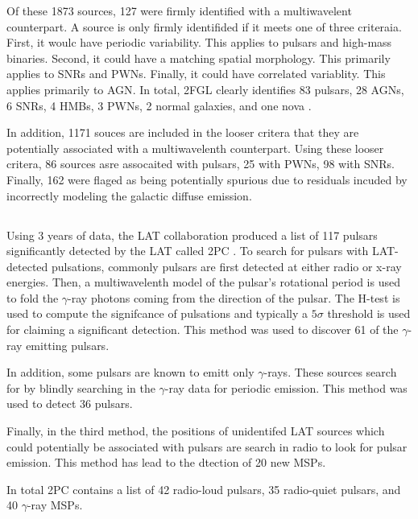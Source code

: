 Of these 1873 sources, 127 were firmly identified with a multiwavelent
counterpart.  A source is only firmly identifided if it meets one of three
criteraia. First, it woulc have periodic variability.  This applies to
pulsars and high-mass binaries.  Second, it could have a matching spatial
morphology. This primarily applies to \acp{SNR} and \acp{PWN}. Finally,
it could have correlated variablity. This applies primarily to \ac{AGN}.
In total, \ac{2FGL} clearly identifies 83 pulsars, 28 \acp{AGN}, 6
\acp{SNR}, 4 \acp{HMB}, 3 \acp{PWN}, 2 normal galaxies, and one nova
\cite{nolan_2012_fermi-large}.

In addition, 1171 souces are included in the looser critera that
they are potentially associated with a multiwavelenth counterpart.
Using these looser critera, 86 sources asre assocaited with pulsars, 25
with \acp{PWN},  98 with \acp{SNR}.  Finally, 162 were flaged as being
potentially spurious due to residuals incuded by incorrectly modeling
the galactic diffuse emission.


\subsection{}
\subseclabel{2pc}

Using 3 years of data, the \ac{LAT} collaboration produced a
list of 117 pulsars significantly detected by the \ac{LAT} called
\acf{2PC} \citep{abdo_2013a_second-fermi}.  To search for pulsars with
\ac{LAT}-detected pulsations, commonly pulsars are first detected at
either radio or x-ray energies. Then, a multiwavelenth model of the
pulsar's rotational period is used to fold the $\gamma$-ray photons
coming from the direction of the pulsar.  The H-test is used to compute
the signifcance of pulsations \citep{de-jager_1989a_poweful-periodic}
and typically a $5\sigma$ threshold is used for claiming a significant
detection.  This method was used to discover 61 of the $\gamma$-ray
emitting pulsars.

In addition, some pulsars are known to emitt only $\gamma$-rays.
These sources search for by blindly searching in the $\gamma$-ray data
for periodic emission. This method was used to detect 36 pulsars.

Finally, in the third method, the positions of unidentifed \ac{LAT}
sources which could potentially be associated with pulsars are search in
radio to look for pulsar emission. This method has lead to the dtection
of 20 new \acp{MSP}.

In total \ac{2PC} contains a list of 42 radio-loud pulsars, 35 radio-quiet
pulsars, and 40 $\gamma$-ray \acp{MSP}.

